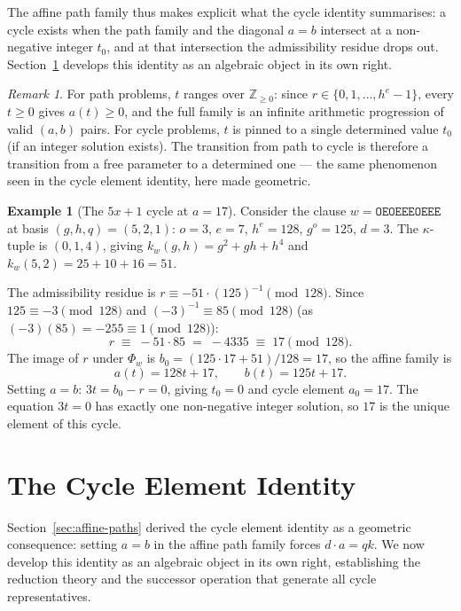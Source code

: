 \documentclass[12pt]{article}
\theoremstyle{definition}
\newtheorem{example}[theorem]{Example}
\theoremstyle{remark}
\newtheorem{remark}[theorem]{Remark}
\newcommand{\ZZ}{\mathbb{Z}}
\newcommand{\kpoly}{k}
\begin{document}
The affine path family thus makes explicit what the cycle identity summarises:
a cycle exists when the path family and the diagonal $a = b$ intersect at a
non-negative integer $t_0$, and at that intersection the admissibility residue
drops out.  Section~\ref{sec:cycle} develops this identity as an algebraic
object in its own right.

\begin{remark}
For path problems, $t$ ranges over $\ZZ_{\geq 0}$: since
$r \in \{0,1,\ldots,h^e-1\}$, every $t \geq 0$ gives $a(t) \geq 0$,
and the full family is an infinite arithmetic progression of valid
$(a,b)$ pairs.  For cycle problems, $t$ is pinned to a single determined
value $t_0$ (if an integer solution exists).  The transition from path to
cycle is therefore a transition from a free parameter to a determined one
— the same phenomenon seen in the cycle element identity, here made geometric.
\end{remark}

\begin{example}[The $5x+1$ cycle at $a = 17$]
\label{ex:affine-5x1}
Consider the clause $w = \texttt{OEOEEEOEEE}$ at basis $(g,h,q) = (5,2,1)$:
$o = 3$, $e = 7$, $h^e = 128$, $g^o = 125$, $d = 3$.
The $\kappa$-tuple is $(0,1,4)$, giving $\kpoly_w(g,h) = g^2 + gh + h^4$
and $\kpoly_w(5,2) = 25 + 10 + 16 = 51$.

The admissibility residue is $r \equiv -51 \cdot (125)^{-1} \pmod{128}$.
Since $125 \equiv -3 \pmod{128}$ and $(-3)^{-1} \equiv 85 \pmod{128}$
(as $(-3)(85) = -255 \equiv 1 \pmod{128}$):
\[
  r \;\equiv\; -51 \cdot 85 \;=\; -4335 \;\equiv\; 17 \pmod{128}.
\]
The image of $r$ under $\Phi_w$ is $b_0 = (125 \cdot 17 + 51)/128 = 17$,
so the affine family is
\[
  a(t) = 128t + 17, \qquad b(t) = 125t + 17.
\]
Setting $a = b$: $3t = b_0 - r = 0$, giving $t_0 = 0$ and cycle element $a_0 = 17$.
The equation $3t = 0$ has exactly one non-negative integer solution,
so $17$ is the unique element of this cycle.
\end{example}

\section{The Cycle Element Identity}
\label{sec:cycle}

Section~\ref{sec:affine-paths} derived the cycle element identity as a
geometric consequence: setting $a = b$ in the affine path family forces
$d \cdot a = qk$.  We now develop this identity as an algebraic object
in its own right, establishing the reduction theory and the successor
operation that generate all cycle representatives.
\end{document}

